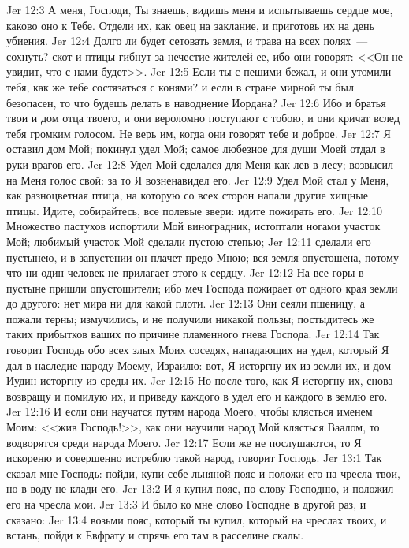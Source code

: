 \vs Jer 12:3 А меня, Господи, Ты знаешь, видишь меня и испытываешь сердце мое, каково оно к Тебе. Отдели их, как овец на заклание, и приготовь их на день убиения.
\vs Jer 12:4 Долго ли будет сетовать земля, и трава на всех полях~--- сохнуть? скот и птицы гибнут за нечестие жителей ее, ибо они говорят: <<Он не увидит, что с нами будет>>.
\vs Jer 12:5 Если ты с пешими бежал, и они утомили тебя, как же тебе состязаться с конями? и если в стране мирной ты был безопасен, то что будешь делать в наводнение Иордана?
\vs Jer 12:6 Ибо и братья твои и дом отца твоего, и они вероломно поступают с тобою, и они кричат вслед тебя громким голосом. Не верь им, когда они говорят тебе и доброе.
\vs Jer 12:7 Я оставил дом Мой; покинул удел Мой; самое любезное для души Моей отдал в руки врагов его.
\vs Jer 12:8 Удел Мой сделался для Меня как лев в лесу; возвысил на Меня голос свой: за то Я возненавидел его.
\vs Jer 12:9 Удел Мой стал у Меня, как разноцветная птица, на которую со всех сторон напали другие хищные птицы. Идите, собирайтесь, все полевые звери: идите пожирать его.
\vs Jer 12:10 Множество пастухов испортили Мой виноградник, истоптали ногами участок Мой; любимый участок Мой сделали пустою степью;
\vs Jer 12:11 сделали его пустынею, и в запустении он плачет предо Мною; вся земля опустошена, потому что ни один человек не прилагает этого к сердцу.
\vs Jer 12:12 На все горы в пустыне пришли опустошители; ибо меч Господа пожирает  от одного края земли до другого: нет мира ни для какой плоти.
\vs Jer 12:13 Они сеяли пшеницу, а пожали терны; измучились, и не получили никакой пользы; постыдитесь же таких прибытков ваших по причине пламенного гнева Господа.
\vs Jer 12:14 Так говорит Господь обо всех злых Моих соседях, нападающих на удел, который Я дал в наследие народу Моему, Израилю: вот, Я исторгну их из земли их, и дом Иудин исторгну из среды их.
\vs Jer 12:15 Но после того, как Я исторгну их, снова возвращу и помилую их, и приведу каждого в удел его и каждого в землю его.
\vs Jer 12:16 И если они научатся путям народа Моего, чтобы клясться именем Моим: <<жив Господь!>>, как они научили народ Мой клясться Ваалом, то водворятся среди народа Моего.
\vs Jer 12:17 Если же не послушаются, то Я искореню и совершенно истреблю такой народ, говорит Господь.
\vs Jer 13:1 Так сказал мне Господь: пойди, купи себе льняной пояс и положи его на чресла твои, но в воду не клади его.
\vs Jer 13:2 И я купил пояс, по слову Господню, и положил его на чресла мои.
\vs Jer 13:3 И было ко мне слово Господне в другой раз, и сказано:
\vs Jer 13:4 возьми пояс, который ты купил, который на чреслах твоих, и встань, пойди к Евфрату и спрячь его там в расселине скалы.
